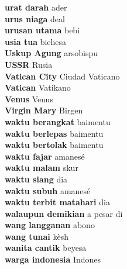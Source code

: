 \textbf{ urat darah  } ader \\
\textbf{ urus niaga  } deal \\
\textbf{ urusan utama  } bebi \\
\textbf{ usia tua  } biehesa \\
\textbf{ Uskup Agung  } arsobispu \\
\textbf{ USSR  } Rusia \\
\textbf{ Vatican City  } Ciudad Vaticano \\
\textbf{ Vatican  } Vatikano \\
\textbf{ Venus  } Venus \\
\textbf{ Virgin Mary  } Birgen \\
\textbf{ waktu berangkat  } baimentu \\
\textbf{ waktu berlepas  } baimentu \\
\textbf{ waktu bertolak  } baimentu \\
\textbf{ waktu fajar  } amanesé \\
\textbf{ waktu malam  } skur \\
\textbf{ waktu siang  } dia \\
\textbf{ waktu subuh  } amanesé \\
\textbf{ waktu terbit matahari  } dia \\
\textbf{ walaupun demikian  } a pesar di \\
\textbf{ wang langganan  } abono \\
\textbf{ wang tunai  } kèsh \\
\textbf{ wanita cantik  } beyesa \\
\textbf{ warga indonesia  } Indones \\
